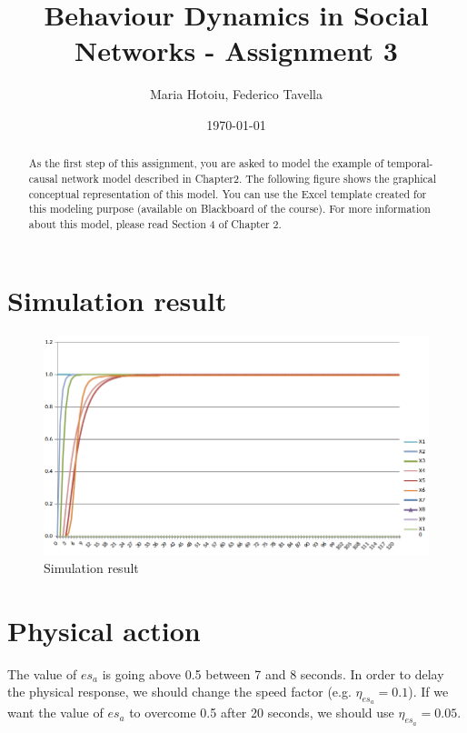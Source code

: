 \documentclass[a4paper]{article}
\title{Behaviour Dynamics in Social Networks - Assignment 3}
\author{Maria Hotoiu, Federico Tavella}
\date{\today}
\begin{document}
\maketitle

\begin{abstract}
As the first step of this assignment, you are asked to model the example of temporal-causal network
model described in Chapter2. The following figure shows the graphical conceptual representation of
this model. You can use the Excel template created for this modeling purpose (available on Blackboard
of the course). For more information about this model, please read Section 4 of Chapter 2.
\end{abstract}

\section{Simulation result}

\begin{figure}[!htpb]
\center
\includegraphics[width=\textwidth]{res/img/results}
\caption{Simulation result}
\label{fig:simulation_result}
\end{figure}

\section{Physical action}

The value of $es_a$ is going above 0.5 between 7 and 8 seconds. In order to delay the physical response, we should change the speed factor (e.g. $\eta_{es_{a}} = 0.1$). If we want the value of $es_{a}$ to overcome 0.5 after 20 seconds, we should use $\eta_{es_{a}} = 0.05$.
\end{document}
